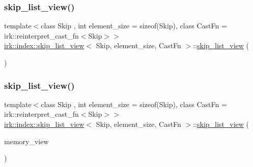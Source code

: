 \mbox{\label{classirk_1_1index_1_1skip__list__view_a2e1d39b4efd56dd98ead2a39713d5508}} 
\subsubsection{\texorpdfstring{skip\+\_\+list\+\_\+view()}{skip\_list\_view()}\hspace{0.1cm}{\footnotesize\ttfamily [3/4]}}
{\footnotesize\ttfamily template$<$class Skip , int element\+\_\+size = sizeof(\+Skip), class Cast\+Fn  = irk\+::reinterpret\+\_\+cast\+\_\+fn$<$\+Skip$>$$>$ \\
\mbox{\hyperlink{classirk_1_1index_1_1skip__list__view}{irk\+::index\+::skip\+\_\+list\+\_\+view}}$<$ Skip, element\+\_\+size, Cast\+Fn $>$\+::\mbox{\hyperlink{classirk_1_1index_1_1skip__list__view}{skip\+\_\+list\+\_\+view}} (\begin{DoxyParamCaption}\item[{\mbox{\hyperlink{classirk_1_1index_1_1skip__list__view}{skip\+\_\+list\+\_\+view}}$<$ Skip, element\+\_\+size, Cast\+Fn $>$ \&\&}]{ }\end{DoxyParamCaption})\hspace{0.3cm}{\ttfamily [default]}}

\mbox{\label{classirk_1_1index_1_1skip__list__view_a9cadb9826ca85f857e83781ca811f6d3}} 
\subsubsection{\texorpdfstring{skip\+\_\+list\+\_\+view()}{skip\_list\_view()}\hspace{0.1cm}{\footnotesize\ttfamily [4/4]}}
{\footnotesize\ttfamily template$<$class Skip , int element\+\_\+size = sizeof(\+Skip), class Cast\+Fn  = irk\+::reinterpret\+\_\+cast\+\_\+fn$<$\+Skip$>$$>$ \\
\mbox{\hyperlink{classirk_1_1index_1_1skip__list__view}{irk\+::index\+::skip\+\_\+list\+\_\+view}}$<$ Skip, element\+\_\+size, Cast\+Fn $>$\+::\mbox{\hyperlink{classirk_1_1index_1_1skip__list__view}{skip\+\_\+list\+\_\+view}} (\begin{DoxyParamCaption}\item[{\mbox{\hyperlink{classirk_1_1memory__view}{irk\+::memory\+\_\+view}}}]{memory\+\_\+view }\end{DoxyParamCaption})\hspace{0.3cm}{\ttfamily [inline]}}



